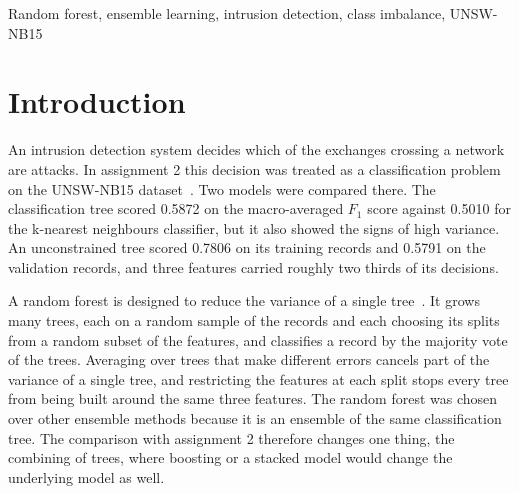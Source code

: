 \documentclass[conference,10pt]{IEEEtran}
\begin{document}
\begin{IEEEkeywords}
Random forest, ensemble learning, intrusion detection, class imbalance,
UNSW-NB15
\end{IEEEkeywords}

\section{Introduction}
\label{sec:introduction}
%

An intrusion detection system decides which of the exchanges crossing a
network are attacks. In assignment 2 this decision was treated as a
classification problem on the UNSW-NB15 dataset~\cite{moustafa2015unsw}. Two models were compared there. The
classification tree scored 0.5872 on the macro-averaged $F_1$ score against
0.5010 for the k-nearest neighbours classifier, but it also showed the signs
of high variance. An unconstrained tree scored 0.7806 on its training records
and 0.5791 on the validation records, and three features carried roughly two
thirds of its decisions.

A random forest is designed to reduce the variance of a single
tree~\cite{breiman2001random}. It grows many trees, each on a random sample
of the records and each choosing its splits from a random subset of the
features, and classifies a record by the majority vote of the trees.
Averaging over trees that make different errors cancels part of the variance
of a single tree, and restricting the features at each split stops every tree
from being built around the same three features. The random forest was chosen
over other ensemble methods because it is an ensemble of the same
classification tree. The comparison with assignment 2 therefore changes one
thing, the combining of trees, where boosting or a stacked model would change
the underlying model as well.
\end{document}
